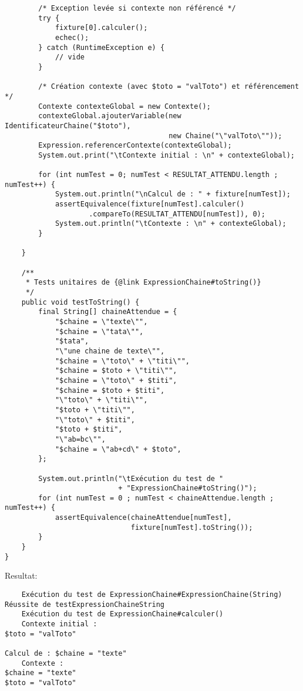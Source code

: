 \begin{enum}
\begin{verbatim}
        /* Exception levée si contexte non référencé */
        try {
            fixture[0].calculer();
            echec();
        } catch (RuntimeException e) {
            // vide
        }
        
        /* Création contexte (avec $toto = "valToto") et référencement */
        Contexte contexteGlobal = new Contexte();
        contexteGlobal.ajouterVariable(new IdentificateurChaine("$toto"),
                                       new Chaine("\"valToto\""));
        Expression.referencerContexte(contexteGlobal);
        System.out.print("\tContexte initial : \n" + contexteGlobal);
        
        for (int numTest = 0; numTest < RESULTAT_ATTENDU.length ; numTest++) {
            System.out.println("\nCalcul de : " + fixture[numTest]);
            assertEquivalence(fixture[numTest].calculer()
                    .compareTo(RESULTAT_ATTENDU[numTest]), 0);
            System.out.println("\tContexte : \n" + contexteGlobal);
        }
        
    }
    
    /**
     * Tests unitaires de {@link ExpressionChaine#toString()}
     */
    public void testToString() {
        final String[] chaineAttendue = {
            "$chaine = \"texte\"",  
            "$chaine = \"tata\"",
            "$tata",
            "\"une chaine de texte\"",
            "$chaine = \"toto\" + \"titi\"",
            "$chaine = $toto + \"titi\"",
            "$chaine = \"toto\" + $titi",
            "$chaine = $toto + $titi",
            "\"toto\" + \"titi\"",
            "$toto + \"titi\"",
            "\"toto\" + $titi",
            "$toto + $titi",
            "\"ab=bc\"",
            "$chaine = \"ab+cd\" + $toto",
        };
        
        System.out.println("\tExécution du test de "
                           + "ExpressionChaine#toString()");
        for (int numTest = 0 ; numTest < chaineAttendue.length ; numTest++) {
            assertEquivalence(chaineAttendue[numTest], 
                              fixture[numTest].toString());
        }
    }
}
\end{verbatim}
Resultat:
\begin{verbatim}
    Exécution du test de ExpressionChaine#ExpressionChaine(String)
Réussite de testExpressionChaineString
    Exécution du test de ExpressionChaine#calculer()
    Contexte initial : 
$toto = "valToto"

Calcul de : $chaine = "texte"
    Contexte : 
$chaine = "texte"
$toto = "valToto"



\end{verbatim}
\end{enum}
